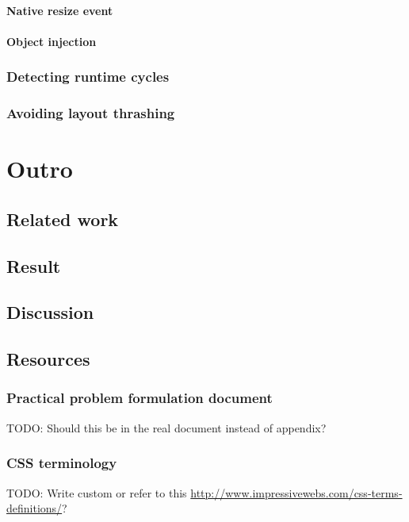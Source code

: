 \documentclass[a4paper,11pt]{kth-mag}
\begin{document}
        \subsection{Native resize event}
        \subsection{Object injection}
      \section{Detecting runtime cycles}\label{sec:imp_cycle_detector}
      \section{Avoiding layout thrashing}\label{sec:imp_batch_processor}

  \part{Outro}\label{part:outro}
    \chapter{Related work}
    \chapter{Result}
    \chapter{Discussion}
  \printbibliography
    \appendix
    \addappheadtotoc
      \chapter{Resources}
        \section{Practical problem formulation document}\label{sec:problem-formulation}
          TODO: Should this be in the real document instead of appendix?          
        \section{CSS terminology}
          TODO: Write custom or refer to this \url{http://www.impressivewebs.com/css-terms-definitions/}?
\end{document}
